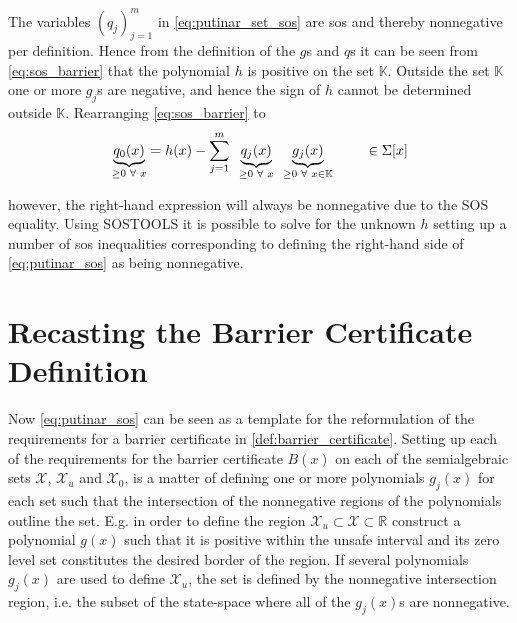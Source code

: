 The variables $(q_j)_{j=1}^m$ in \autoref{eq:putinar_set_sos} are \gls{sos} and thereby nonnegative per definition. Hence from the definition of the $g$s and $q$s it can be seen from \autoref{eq:sos_barrier} that the polynomial $h$ is positive on the set $\mathbb{K}$.
Outside the set $\mathbb{K}$ one or more $g_j$s are negative, and hence the sign of $h$ cannot be determined outside $\mathbb{K}$.
Rearranging \autoref{eq:sos_barrier} to
\vspace{-2mm}
\begin{equation}
\underbrace{q_0(x)}_{\geq 0\,\,\forall \,\,x} = h(x) - \sum _{j=1}^{m}\,\,\,\underbrace{q_j(x)}_{\geq 0\,\,\forall \,\,x}\,\,\,\underbrace{g_j(x)}_{\geq 0 \,\,\forall \,\,x\in\mathbb{K}} \hspace{0.8cm} \in\Sigma[x]\label{eq:putinar_sos}
\end{equation} 

\vspace{-1mm}
however, the right-hand expression will always be nonnegative due to the SOS equality. Using SOSTOOLS  it is possible to solve for the unknown $h$ setting up a number of \gls{sos} inequalities corresponding to defining the right-hand side of \autoref{eq:putinar_sos} as being nonnegative. %

\section{Recasting the Barrier Certificate Definition}
\vspace{-2mm}
Now \autoref{eq:putinar_sos} can be seen as a template for the reformulation of the requirements for a barrier certificate in \autoref{def:barrier_certificate}.
Setting up each of the requirements for the barrier certificate $B(x)$ on each of the  semialgebraic sets $\mathcal{X}$, $\mathcal{X}_u$ and $\mathcal{X}_0$, is a matter of defining one or more polynomials $g_j(x)$ for each set such that the intersection of the nonnegative regions of the polynomials outline the set.
E.g. in order to define the region $\mathcal{X}_u\subset\mathcal{X}\subset\mathbb{R}$ construct a polynomial $g(x)$ such that it is positive within the unsafe interval and its zero level set constitutes the desired border of the region. If several polynomials $g_j(x)$ are used to define $\mathcal{X}_u$, the set is defined by the nonnegative intersection region, i.e. the subset of the state-space where all of the $g_j(x)$s are nonnegative.


